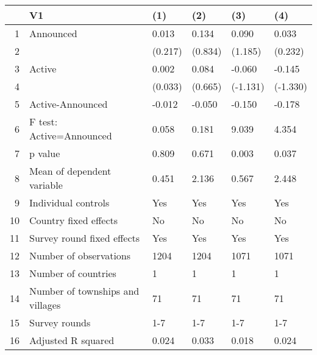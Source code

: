 \begin{table}[ht]
\centering
\begin{tabular}{rlllll}
  \hline
 & V1 & (1) & (2) & (3) & (4) \\ 
  \hline
1 & Announced & 0.013 & 0.134 & 0.090 & 0.033 \\ 
  2 &  & (0.217) & (0.834) & (1.185) & (0.232) \\ 
  3 & Active & 0.002 & 0.084 & -0.060 & -0.145 \\ 
  4 &  & (0.033) & (0.665) & (-1.131) & (-1.330) \\ 
  5 & Active-Announced & -0.012 & -0.050 & -0.150 & -0.178 \\ 
  6 & F test: Active=Announced & 0.058 & 0.181 & 9.039 & 4.354 \\ 
  7 & p value & 0.809 & 0.671 & 0.003 & 0.037 \\ 
  8 & Mean of dependent variable & 0.451 & 2.136 & 0.567 & 2.448 \\ 
  9 & Individual controls & Yes & Yes & Yes & Yes \\ 
  10 & Country fixed effects & No & No & No & No \\ 
  11 & Survey round fixed effects & Yes & Yes & Yes & Yes \\ 
  12 & Number of observations & 1204 & 1204 & 1071 & 1071 \\ 
  13 & Number of countries & 1 & 1 & 1 & 1 \\ 
  14 & Number of townships and villages & 71 & 71 & 71 & 71 \\ 
  15 & Survey rounds & 1-7 & 1-7 & 1-7 & 1-7 \\ 
  16 & Adjusted R squared & 0.024 & 0.033 & 0.018 & 0.024 \\ 
   \hline
\end{tabular}
\end{table}
